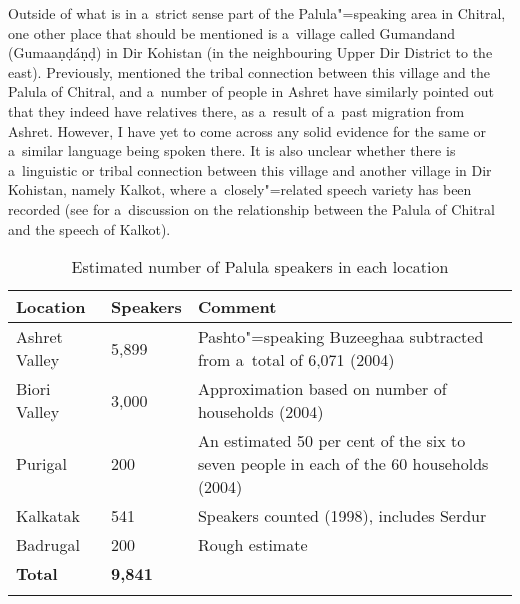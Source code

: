 Outside of what is in a~strict sense part of the Palula"=speaking area in Chitral, one other place
that should be mentioned is a~village called Gumandand (Gumaaṇḍáṇḍ) in Dir Kohistan (in the
neighbouring Upper Dir District to the east). Previously, \citet[9]{morgenstierne1941} mentioned the
tribal connection between this village and the Palula of Chitral, and a~number of people in Ashret
have similarly pointed out that they indeed have relatives there, as a~result of a~past migration
from Ashret. However, I have yet to come across any solid evidence for the same or a~similar
language being spoken there. It is also unclear whether there is a~linguistic or tribal connection
between this village and another village in Dir Kohistan, namely Kalkot, where a~closely"=related
speech variety has been recorded (see  for a~discussion on the
relationship between the Palula of Chitral and the speech of Kalkot).


\begin{table}
\caption{Estimated number of Palula speakers in each location}
\begin{tabularx}{\textwidth}{ l l Q }
\lsptoprule
Location &
Speakers &
Comment\\\midrule
Ashret Valley &
5,899 &
Pashto"=speaking Buzeeghaa subtracted from a~total of 6,071 (2004)\\
Biori Valley &
3,000 &
Approximation based on number of households (2004)\\
Purigal &
\phantom{9}200 &
An estimated 50 per cent of the six to seven people in each of the 60 households (2004)\\
Kalkatak &
\phantom{9}541 &
Speakers counted (1998), includes Serdur\\
Badrugal &
\phantom{9}200 &
Rough estimate\\
\textbf{Total} &
\textbf{9,841} &
\\\lspbottomrule
\end{tabularx}
\label{tab:1-1}
\end{table}


